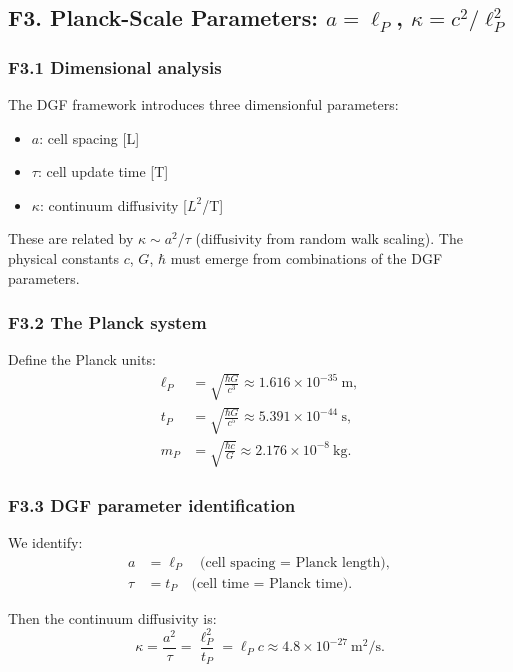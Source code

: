 \documentclass[reprint]{revtex4-2}
\begin{document}
\subsection{F3. Planck-Scale Parameters: $a=\ell_P$, $\kappa = c^2/\ell_P^2$}

\subsubsection{F3.1 Dimensional analysis}

The DGF framework introduces three dimensionful parameters:
\begin{itemize}
\item $a$: cell spacing [L]
\item $\tau$: cell update time [T]
\item $\kappa$: continuum diffusivity [$L^2$/T]
\end{itemize}

These are related by $\kappa \sim a^2/\tau$ (diffusivity from random walk scaling). The physical constants $c$, $G$, $\hbar$ must emerge from combinations of the DGF parameters.

\subsubsection{F3.2 The Planck system}

Define the Planck units:
\begin{align}
\ell_P &= \sqrt{\frac{\hbar G}{c^3}} \approx 1.616\times 10^{-35}~\text{m},\\
t_P &= \sqrt{\frac{\hbar G}{c^5}} \approx 5.391\times 10^{-44}~\text{s},\\
m_P &= \sqrt{\frac{\hbar c}{G}} \approx 2.176\times 10^{-8}~\text{kg}.
\end{align}

\subsubsection{F3.3 DGF parameter identification}

We identify:
\begin{align}
a &= \ell_P \quad \text{(cell spacing = Planck length)},\\
\tau &= t_P \quad \text{(cell time = Planck time)}.
\end{align}

Then the continuum diffusivity is:
\begin{equation}
\kappa = \frac{a^2}{\tau} = \frac{\ell_P^2}{t_P} = \ell_P c \approx 4.8\times 10^{-27}~\text{m}^2/\text{s}.
\label{eq:kappa_planck}
\end{equation}
\end{document}
